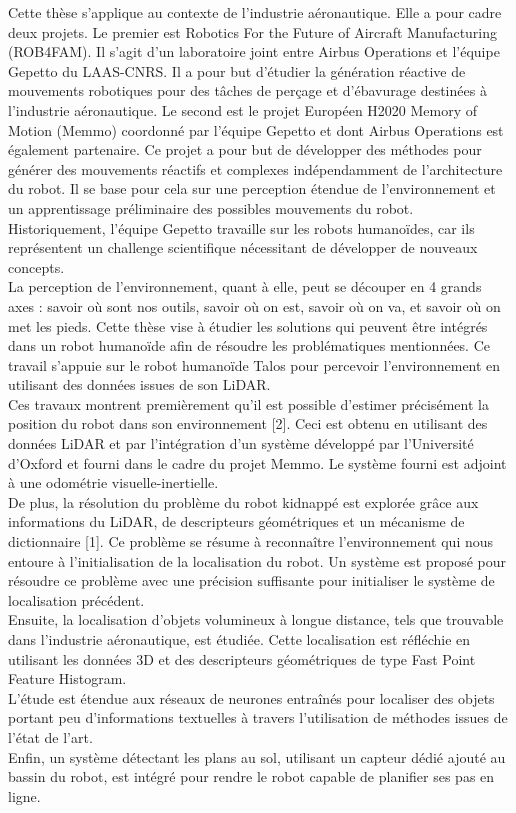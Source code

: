 \documentclass[11pt,a4paper,sans]{moderncv}         %
\begin{document}
{
  Cette th\`ese s'applique au contexte de l'industrie a\'eronautique.
  Elle a pour cadre deux projets.
  Le premier est Robotics For the Future of Aircraft Manufacturing (ROB4FAM).
  Il s'agit d'un laboratoire joint entre Airbus Operations et l'\'equipe Gepetto du LAAS-CNRS.
  Il a pour but d'\'etudier la g\'en\'eration r\'eactive de mouvements robotiques pour des t\^aches de per\c cage et d'\'ebavurage destin\'ees \`a l'industrie a\'eronautique.
  Le second est le projet Europ\'een H2020 Memory of Motion (Memmo) coordonn\'e par l'\'equipe Gepetto et dont Airbus Operations est \'egalement partenaire.
  Ce projet a pour but de d\'evelopper des m\'ethodes pour g\'en\'erer des mouvements r\'eactifs et complexes ind\'ependamment de l'architecture du robot.
  Il se base pour cela sur une perception \'etendue de l'environnement et un apprentissage pr\'eliminaire des possibles mouvements du robot.
  Historiquement, l'\'equipe Gepetto travaille sur les robots humano\"ides, car ils repr\'esentent un challenge scientifique n\'ecessitant de d\'evelopper de nouveaux concepts.\\
  La perception de l'environnement, quant \`a elle, peut se d\'ecouper en 4 grands axes : savoir o\`u sont nos outils, savoir o\`u on est, savoir o\`u on va, et savoir o\`u on met les pieds.
  Cette th\`ese vise \`a \'etudier les solutions qui peuvent \^etre int\'egr\'es dans un robot humano\"ide afin de r\'esoudre les probl\'ematiques mentionn\'ees.
  Ce travail s'appuie sur le robot humano\"ide Talos pour percevoir l'environnement en utilisant des donn\'ees issues de son LiDAR.\\
  Ces travaux montrent premi\`erement qu'il est possible d'estimer pr\'ecis\'ement la position du robot dans son environnement {[2]}.
  Ceci est obtenu en utilisant des donn\'ees LiDAR et par l'int\'egration d'un syst\`eme d\'evelopp\'e par l'Universit\'e d'Oxford et fourni dans le cadre du projet Memmo.
  Le syst\`eme fourni est adjoint \`a une odom\'etrie visuelle-inertielle.\\
  De plus, la r\'esolution du probl\`eme du robot kidnapp\'e est explor\'ee gr\^ace aux informations du LiDAR, de descripteurs g\'eom\'etriques et un m\'ecanisme de dictionnaire {[1]}.
  Ce probl\`eme se r\'esume \`a reconna\^itre l'environnement qui nous entoure \`a l'initialisation de la localisation du robot.
  Un syst\`eme est propos\'e pour r\'esoudre ce probl\`eme avec une pr\'ecision suffisante pour initialiser le syst\`eme de localisation pr\'ec\'edent.\\
  Ensuite, la localisation d'objets volumineux \`a longue distance, tels que trouvable dans l'industrie a\'eronautique, est \'etudi\'ee.
  Cette localisation est r\'efl\'echie en utilisant les donn\'ees 3D et des descripteurs g\'eom\'etriques de type Fast Point Feature Histogram.\\
  L'\'etude est \'etendue aux r\'eseaux de neurones entra\^in\'es pour localiser des objets portant peu d'informations textuelles \`a travers l'utilisation de m\'ethodes issues de l'\'etat de l'art.\\
  Enfin, un syst\`eme d\'etectant les plans au sol, utilisant un capteur d\'edi\'e ajout\'e au bassin du robot, est int\'egr\'e pour rendre le robot capable de planifier ses pas en ligne.
}
\end{document}
